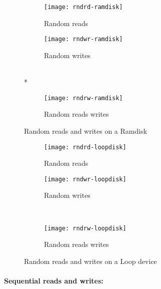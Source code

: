 \begin{figure}[!ht]
  \begin{subfigure}[b]{0.2\textwidth}
  \texttt{[image: rndrd-ramdisk]}
  \caption{Random reads}
  \label{subfig:rndrd-ramdisk}
  \end{subfigure}
  \hspace{50mm}
  \begin{subfigure}[b]{0.2\textwidth}
  \texttt{[image: rndwr-ramdisk]}
  \caption{Random writes}
  \label{subfig:rndwr-ramdisk}
  \end{subfigure}\\*
  \hspace{150mm}
  \begin{subfigure}[b]{0.3\textwidth}
  \texttt{[image: rndrw-ramdisk]}
  \caption{Random reads writes}
  \label{subfig:rndrw-ramdisk}
  \end{subfigure}
  \caption{Random reads and writes on a Ramdisk}\label{fig:rndramdisk}
\end{figure}

\begin{figure}[!ht]
  \begin{subfigure}[b]{0.2\textwidth}
  \texttt{[image: rndrd-loopdisk]}
  \caption{Random reads}
  \label{subfig:rndrd-loopdisk}
  \end{subfigure}
  \hspace{50mm}
  \begin{subfigure}[b]{0.2\textwidth}
  \texttt{[image: rndwr-loopdisk]}
  \caption{Random writes}
  \label{subfig:rndwr-loopdisk}
  \end{subfigure}\\
  \begin{subfigure}[b]{0.3\textwidth}
  \texttt{[image: rndrw-loopdisk]}
  \caption{Random reads writes}
  \label{subfig:rndrw-loopdisk}
  \end{subfigure}
\caption{Random reads and writes on a Loop device}\label{fig:rndloopdisk}
\end{figure}
\pagebreak
\paragraph{Sequential reads and writes:}
